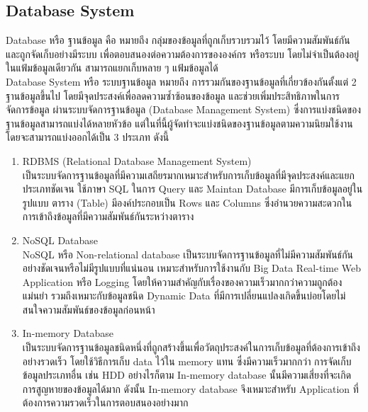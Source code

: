 \documentclass[12pt,oneside,openright,a4paper]{cpe-thai-project}
\begin{document}
\subsection{Database System}
\hspace*{1cm} Database หรือ ฐานข้อมูล คือ หมายถึง กลุ่มของข้อมูลที่ถูกเก็บรวบรวมไว้ โดยมีความสัมพันธ์กัน และถูกจัดเก็บอย่างมีระบบ เพื่อตอบสนองต่อความต้องการขององค์กร หรือระบบ โดยไม่จำเป็นต้องอยู่ในแฟ้มข้อมูลเดียวกัน สามารถแยกเก็บหลาย ๆ แฟ้มข้อมูลได้\\
\hspace*{1cm} Database System หรือ ระบบฐานข้อมูล หมายถึง การรวมกันของฐานข้อมูลที่เกี่ยวข้องกันตั้งแต่ 2 ฐานข้อมูลขึ้นไป โดยมีจุดประสงค์เพื่อลดความซ้ำซ้อนของข้อมูล และช่วยเพิ่มประสิทธิภาพในการจัดการข้อมูล ผ่านระบบจัดการฐานข้อมูล (Database Management System) ซึ่งการแบ่งชนิดของฐานข้อมูลสามารถแบ่งได้หลายหัวข้อ แต่ในที่นี้ผู้จัดทำจะแบ่งชนิดของฐานข้อมูลตามความนิยมใช้งาน โดยจะสามารถแบ่งออกได้เป็น 3 ประเภท ดังนี้
\begin{enumerate}
    \item {RDBMS (Relational Database Management System)}\\
    \hspace*{1cm}เป็นระบบจัดการฐานข้อมูลที่มีความเสถียรมากเหมาะสำหรับการเก็บข้อมูลที่มีจุดประสงค์และแยกประเภทชัดเจน ใช้ภาษา SQL ในการ Query และ Maintan Database มีการเก็บข้อมูลอยู่ในรูปแบบ ตาราง (Table) มีองค์ประกอบเป็น Rows และ Columns ซึ่งอำนวยความสะดวกในการเข้าถึงข้อมูลที่มีความสัมพันธ์กันระหว่างตาราง
    \item {NoSQL Database}\\
    \hspace*{1cm}NoSQL หรือ Non-relational database เป็นระบบจัดการฐานข้อมูลที่ไม่มีความสัมพันธ์กันอย่างชัดเจนหรือไม่มีรูปแบบที่แน่นอน เหมาะสำหรับการใช้งานกับ Big Data Real-time Web Application หรือ Logging โดยให้ความสำคัญกับเรื่องของความเร็วมากกว่าความถูกต้องแม่นยำ รวมถึงเหมาะกับข้อมูลชนิด Dynamic Data ที่มีการเปลี่ยนแปลงเกิดขึ้นบ่อยโดยไม่สนใจความสัมพันธ์ของข้อมูลก่อนหน้า
    \item {In-memory Database}\\
    \hspace*{1cm}เป็นระบบจัดการฐานข้อมูลชนิดหนึ่งที่ถูกสร้างขึ้นเพื่อวัตถุประสงค์ในการเก็บข้อมูลที่ต้องการเข้าถึงอย่างรวดเร็ว โดยใช้วิธีการเก็บ data ไว้ใน memory แทน ซึ่งมีความเร็วมากกว่า การจัดเก็บข้อมูลประเภทอื่น เช่น HDD อย่างไรก็ตาม In-memory database นั้นมีความเสี่ยงที่จะเกิดการสูญหายของข้อมูลได้มาก ดังนั้น In-memory database จึงเหมาะสำหรับ Application ที่ต้องการความรวดเร็วในการตอบสนองอย่างมาก
\end{enumerate}
\end{document}
